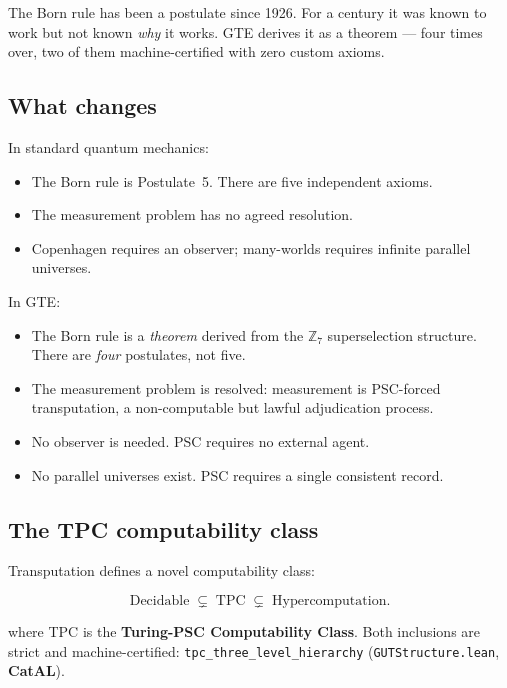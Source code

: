 \documentclass[11pt,a4paper]{article}
\newcommand{\term}[1]{\textbf{#1}}
\newcommand{\lean}[1]{\texttt{#1}}
\newcommand{\CatAL}{\textbf{CatAL}}
\begin{document}
\begin{tcolorbox}[colback=boxred,colframe=red!50!black,title=The 100-year problem]
The Born rule has been a postulate since 1926.  For a century it was known to work
but not known \emph{why} it works.  GTE derives it as a theorem --- four times over,
two of them machine-certified with zero custom axioms.
\end{tcolorbox}

\subsection{What changes}

In standard quantum mechanics:
\begin{itemize}
  \item The Born rule is Postulate~5.  There are five independent axioms.
  \item The measurement problem has no agreed resolution.
  \item Copenhagen requires an observer; many-worlds requires infinite parallel universes.
\end{itemize}

In GTE:
\begin{itemize}
  \item The Born rule is a \emph{theorem} derived from the $\mathbb{Z}_7$ superselection
    structure.  There are \emph{four} postulates, not five.
  \item The measurement problem is resolved: measurement is PSC-forced transputation,
    a non-computable but lawful adjudication process.
  \item No observer is needed.  PSC requires no external agent.
  \item No parallel universes exist.  PSC requires a single consistent record.
\end{itemize}

\subsection{The TPC computability class}

Transputation defines a novel computability class:

\begin{center}
\[
  \text{Decidable} \;\subsetneq\; \text{TPC} \;\subsetneq\; \text{Hypercomputation.}
\]
\end{center}

\noindent
where TPC is the \term{Turing-PSC Computability Class}.  Both inclusions are strict
and machine-certified:
\lean{tpc\_three\_level\_hierarchy} (\texttt{GUTStructure.lean}, \CatAL).
\end{document}
